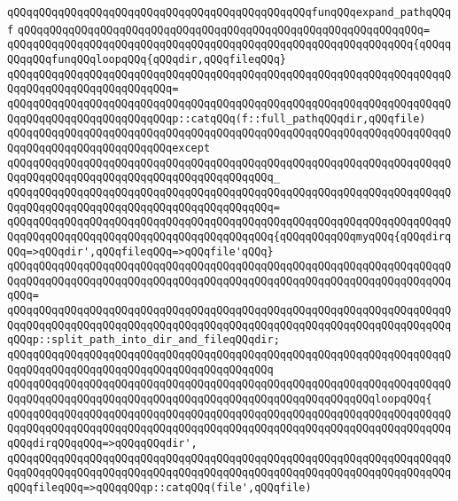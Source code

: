 \newline
\verb|qQQqqQQqqQQqqQQqqQQqqQQqqQQqqQQqqQQqqQQqqQQqqQQqfunqQQqexpand_pathqQQqf|\newline
\verb|qQQqqQQqqQQqqQQqqQQqqQQqqQQqqQQqqQQqqQQqqQQqqQQqqQQqqQQqqQQqqQQq=|\newline
\verb|qQQqqQQqqQQqqQQqqQQqqQQqqQQqqQQqqQQqqQQqqQQqqQQqqQQqqQQqqQQqqQQq{qQQqqQQqqQQqfunqQQqloopqQQq{qQQqdir,qQQqfileqQQq}|\newline
\verb|qQQqqQQqqQQqqQQqqQQqqQQqqQQqqQQqqQQqqQQqqQQqqQQqqQQqqQQqqQQqqQQqqQQqqQQqqQQqqQQqqQQqqQQqqQQqqQQq=|\newline
\verb|qQQqqQQqqQQqqQQqqQQqqQQqqQQqqQQqqQQqqQQqqQQqqQQqqQQqqQQqqQQqqQQqqQQqqQQqqQQqqQQqqQQqqQQqqQQqqQQqp::catqQQq(f::full_pathqQQqdir,qQQqfile)|\newline
\verb|qQQqqQQqqQQqqQQqqQQqqQQqqQQqqQQqqQQqqQQqqQQqqQQqqQQqqQQqqQQqqQQqqQQqqQQqqQQqqQQqqQQqqQQqqQQqqQQqexcept|\newline
\verb|qQQqqQQqqQQqqQQqqQQqqQQqqQQqqQQqqQQqqQQqqQQqqQQqqQQqqQQqqQQqqQQqqQQqqQQqqQQqqQQqqQQqqQQqqQQqqQQqqQQqqQQqqQQqqQQq_|\newline
\verb|qQQqqQQqqQQqqQQqqQQqqQQqqQQqqQQqqQQqqQQqqQQqqQQqqQQqqQQqqQQqqQQqqQQqqQQqqQQqqQQqqQQqqQQqqQQqqQQqqQQqqQQqqQQqqQQq=|\newline
\verb|qQQqqQQqqQQqqQQqqQQqqQQqqQQqqQQqqQQqqQQqqQQqqQQqqQQqqQQqqQQqqQQqqQQqqQQqqQQqqQQqqQQqqQQqqQQqqQQqqQQqqQQqqQQqqQQq{qQQqqQQqqQQqmyqQQq{qQQqdirqQQq=>qQQqdir',qQQqfileqQQq=>qQQqfile'qQQq}|\newline
\verb|qQQqqQQqqQQqqQQqqQQqqQQqqQQqqQQqqQQqqQQqqQQqqQQqqQQqqQQqqQQqqQQqqQQqqQQqqQQqqQQqqQQqqQQqqQQqqQQqqQQqqQQqqQQqqQQqqQQqqQQqqQQqqQQqqQQqqQQqqQQqqQQq=|\newline
\verb|qQQqqQQqqQQqqQQqqQQqqQQqqQQqqQQqqQQqqQQqqQQqqQQqqQQqqQQqqQQqqQQqqQQqqQQqqQQqqQQqqQQqqQQqqQQqqQQqqQQqqQQqqQQqqQQqqQQqqQQqqQQqqQQqqQQqqQQqqQQqqQQqp::split_path_into_dir_and_fileqQQqdir;|\newline
\verb|qQQqqQQqqQQqqQQqqQQqqQQqqQQqqQQqqQQqqQQqqQQqqQQqqQQqqQQqqQQqqQQqqQQqqQQqqQQqqQQqqQQqqQQqqQQqqQQqqQQqqQQqqQQqqQQq|\newline
\verb|qQQqqQQqqQQqqQQqqQQqqQQqqQQqqQQqqQQqqQQqqQQqqQQqqQQqqQQqqQQqqQQqqQQqqQQqqQQqqQQqqQQqqQQqqQQqqQQqqQQqqQQqqQQqqQQqqQQqqQQqqQQqqQQqloopqQQq{|\newline
\verb|qQQqqQQqqQQqqQQqqQQqqQQqqQQqqQQqqQQqqQQqqQQqqQQqqQQqqQQqqQQqqQQqqQQqqQQqqQQqqQQqqQQqqQQqqQQqqQQqqQQqqQQqqQQqqQQqqQQqqQQqqQQqqQQqqQQqqQQqqQQqqQQqdirqQQqqQQq=>qQQqqQQqdir',|\newline
\verb|qQQqqQQqqQQqqQQqqQQqqQQqqQQqqQQqqQQqqQQqqQQqqQQqqQQqqQQqqQQqqQQqqQQqqQQqqQQqqQQqqQQqqQQqqQQqqQQqqQQqqQQqqQQqqQQqqQQqqQQqqQQqqQQqqQQqqQQqqQQqqQQqfileqQQq=>qQQqqQQqp::catqQQq(file',qQQqfile)|\newline

